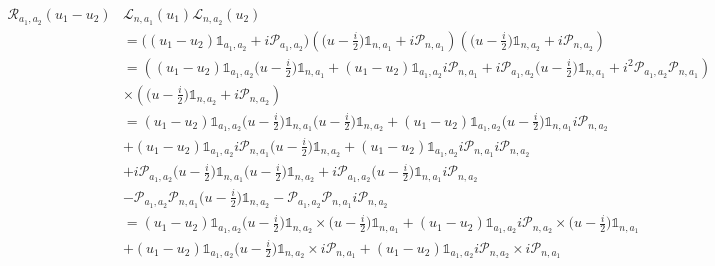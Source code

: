 \documentclass{homework}
\begin{document}
\begin{align*}
    \bm{\mathcal{R}}_{a_1, a_2}(u_1-u_2) & \bm{\mathcal{L}}_{n, a_1} (u_1) \bm{\mathcal{L}}_{n, a_2} (u_2) \\ 
    &= {\bigg((u_1-u_2) \mathds{1}_{a_1, a_2} 
    + i \bm{\mathcal{P}}_{a_1, a_2}\bigg)}   \left(\bigg(u-\frac{i}{2}\bigg) \mathds{1}_{n, a_1} + i \bm{\mathcal{P}}_{n, a_1}\right) \left(\bigg(u-\frac{i}{2}\bigg) \mathds{1}_{n, a_2} + i \bm{\mathcal{P}}_{n, a_2}\right) \\
    &= \left({(u_1-u_2) \mathds{1}_{a_1, a_2} \bigg(u-\frac{i}{2}\bigg) \mathds{1}_{n, a_1}} + {(u_1-u_2) \mathds{1}_{a_1, a_2} i \bm{\mathcal{P}}_{n, a_1}} + i \bm{\mathcal{P}}_{a_1, a_2} \bigg(u-\frac{i}{2}\bigg) \mathds{1}_{n, a_1} + i^2 \bm{\mathcal{P}}_{a_1, a_2}  \bm{\mathcal{P}}_{n, a_1} \right) \\
    & \times \left(\bigg(u-\frac{i}{2}\bigg) \mathds{1}_{n, a_2} + i \bm{\mathcal{P}}_{n, a_2}\right) \\
    &= {(u_1-u_2) \mathds{1}_{a_1, a_2} \bigg(u-\frac{i}{2}\bigg) \mathds{1}_{n, a_1}} \bigg(u-\frac{i}{2}\bigg) \mathds{1}_{n, a_2} + {(u_1-u_2) \mathds{1}_{a_1, a_2} \bigg(u-\frac{i}{2}\bigg) \mathds{1}_{n, a_1}} i \bm{\mathcal{P}}_{n, a_2} \\
    &+ {(u_1-u_2) \mathds{1}_{a_1, a_2} i \bm{\mathcal{P}}_{n, a_1}} \bigg(u-\frac{i}{2}\bigg) \mathds{1}_{n, a_2} + {(u_1-u_2) \mathds{1}_{a_1, a_2} i \bm{\mathcal{P}}_{n, a_1}} i \bm{\mathcal{P}}_{n, a_2} \\ 
    &+ i \bm{\mathcal{P}}_{a_1, a_2} \bigg(u-\frac{i}{2}\bigg)\mathds{1}_{n, a_1}  \bigg(u-\frac{i}{2}\bigg) \mathds{1}_{n, a_2} + i \bm{\mathcal{P}}_{a_1, a_2} \bigg(u-\frac{i}{2}\bigg) \mathds{1}_{n, a_1} i \bm{\mathcal{P}}_{n, a_2} \\
    & - \bm{\mathcal{P}}_{a_1, a_2}  \bm{\mathcal{P}}_{n, a_1}  \bigg(u-\frac{i}{2}\bigg) \mathds{1}_{n, a_2} - \bm{\mathcal{P}}_{a_1, a_2}  \bm{\mathcal{P}}_{n, a_1} i \bm{\mathcal{P}}_{n, a_2} \\
    & = {(u_1-u_2) \mathds{1}_{a_1, a_2}  \bigg(u-\frac{i}{2}\bigg) \mathds{1}_{n, a_2}} \times \bigg(u-\frac{i}{2}\bigg) \mathds{1}_{n, a_1} + {(u_1-u_2) \mathds{1}_{a_1, a_2} i \bm{\mathcal{P}}_{n, a_2}} \times \bigg(u-\frac{i}{2}\bigg) \mathds{1}_{n, a_1} \\
    &+ {(u_1-u_2) \mathds{1}_{a_1, a_2} \bigg(u-\frac{i}{2}\bigg) \mathds{1}_{n, a_2}} \times  i \bm{\mathcal{P}}_{n, a_1} + {(u_1-u_2) \mathds{1}_{a_1, a_2} i \bm{\mathcal{P}}_{n, a_2}} \times i \bm{\mathcal{P}}_{n, a_1} \\

\end{align*}
\end{document}
